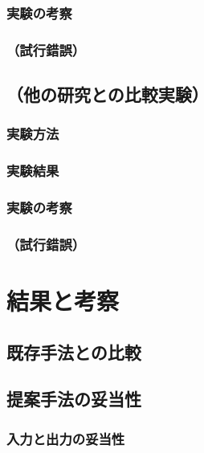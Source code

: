 \documentclass[12pt,a4j]{jreport}
\begin{document}
\subsection{実験の考察}


\subsection{（試行錯誤）}


\section{（他の研究との比較実験）}


\subsection{実験方法}


\subsection{実験結果}


\subsection{実験の考察}


\subsection{（試行錯誤）}



\chapter{結果と考察}


\section{既存手法との比較}


\section{提案手法の妥当性}


\subsection{入力と出力の妥当性}
\end{document}
